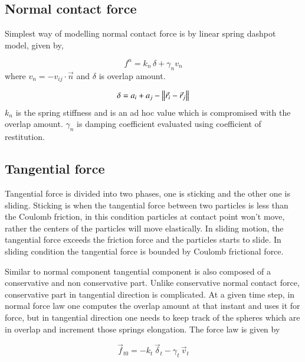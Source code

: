 \subsection{Normal contact force}
\label{sec:normal-contact-force}

Simplest way of modelling normal contact force is by linear spring dashpot
model, given by,


\begin{equation*}
  \label{eq:delta_overlap}
  f^n = k_n \, \delta + \gamma_n v_n
\end{equation*}
where $v_n = -v_{ij}\cdot \vec{n}$ and $\delta$ is overlap amount.

\begin{equation*}
  \delta = a_i + a_j - \norm{\vec{r}_i - \vec{r}_j}
\end{equation*}
$k_n$ is the spring stiffness and is an ad hoc value which is compromised with
the overlap amount. $\gamma_n$ is damping coefficient evaluated using
coefficient of restitution.


\subsection{Tangential force}
\label{sec:tangential-force}

Tangential force is divided into two phases, one is sticking and the other one
is sliding. Sticking is when the tangential force between two particles is less
than the Coulomb friction, in this condition particles at contact point won't
move, rather the centers of the particles will move elastically. In sliding
motion, the tangential force exceeds the friction force and the particles starts
to slide. In sliding condition the tangential force is bounded by Coulomb
frictional force.

Similar to normal component tangential component is also composed
of a conservative and non conservative part. Unlike conservative normal contact
force, conservative part in tangential direction is complicated. At a given time
step, in normal force law one computes the overlap amount at that instant and
uses it for force, but in tangential direction one needs to keep track of the
spheres which are in overlap and increment those springs elongation. The force
law is given by

\begin{equation}
  \label{eq:tangential_force_spring_damping}
  \vec{f}_{t0} = -k_t \, \vec{\delta}_t - \gamma_t \, \vec{v}_t
\end{equation}


